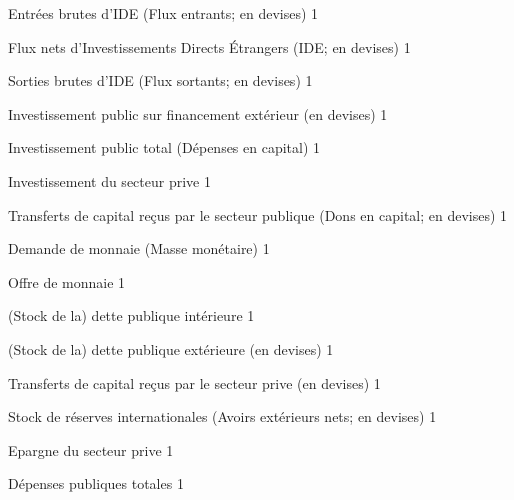 \documentclass[11pt,a4paper]{article}
\newcommand{\NDDG}{\mathit{NDDG}}
\newcommand{\TOTG}{\mathit{TOTG}}
\newcommand{\FINVG}{\mathit{FINVG}}
\newcommand{\INVG}{\mathit{INVG}}
\newcommand{\KTRG}{\mathit{KTRG}}
\newcommand{\NFDG}{\mathit{NFDG}}
\newcommand{\SP}{\mathit{SP}}
\newcommand{\RES}{\mathit{RES}}
\newcommand{\OTHKTR}{\mathit{OTHKTR}}
\newcommand{\FDI}{\mathit{FDI}}
\newcommand{\MD}{\mathit{MD}}
\newcommand{\INVP}{\mathit{INVP}}
\begin{document}
\begin{description}[leftmargin=!,labelwidth=\widthof{\bfseries AAAAAAAA},parsep=10pt]
		\item[$\FDI^{\mathit{IN}}$]          Entrées brutes d'IDE (Flux entrants; en devises)	\hfill 1
		\item[$\FDI^{\mathit{NET}}$]         Flux nets d'Investissements Directs Étrangers (IDE; en devises)	\hfill 1
		\item[$\FDI^{\mathit{OUT}}$]         Sorties brutes d'IDE (Flux sortants; en devises)	\hfill 1
		\item[$\FINVG$]           Investissement public sur financement extérieur (en devises)	\hfill 1
		\item[$\INVG$]            Investissement public total (Dépenses en capital)	\hfill 1
		\item[$\INVP$]            Investissement du secteur prive	\hfill 1
		\item[$\KTRG$]            Transferts de capital reçus par le secteur publique (Dons en capital; en devises)	\hfill 1
		\item[$\MD$]              Demande de monnaie (Masse monétaire)	\hfill 1
		\item[$\MD$]              Offre de monnaie	\hfill 1
		\item[$\NDDG$]            (Stock de la) dette publique intérieure	\hfill 1
		\item[$\NFDG$]            (Stock de la) dette publique extérieure (en devises)	\hfill 1
		\item[$\OTHKTR$]          Transferts de capital reçus par le secteur prive (en devises)	\hfill 1
		\item[$\RES$]             Stock de réserves internationales (Avoirs extérieurs nets; en devises)	\hfill 1
		\item[$\SP$]              Epargne du secteur prive	\hfill 1
		\item[$\TOTG$]            Dépenses publiques totales	\hfill 1
	\end{description}
	
	
	
\end{document}
